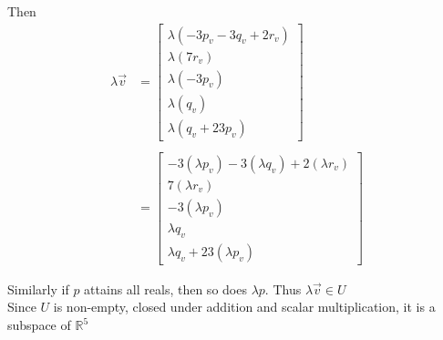 \documentclass{article}
\begin{document}
\begin{enumerate}[(a)]
    Then 
    \begin{align*}
    \lambda \vec{v} &= \begin{bmatrix}
        \lambda (-3p_v - 3q_v + 2r_v) \\
        \lambda (7r_v) \\
        \lambda (-3p_v) \\
        \lambda (q_v) \\
        \lambda (q_v + 23p_v )
    \end{bmatrix} \\
    \\
    & = \begin{bmatrix}
        -3(\lambda p_v) - 3(\lambda q_v) + 2(\lambda r_v) \\
        7(\lambda r_v) \\
        -3(\lambda p_v) \\
        \lambda q_v \\
        \lambda q_v  + 23(\lambda p_v) 
    \end{bmatrix}
    \end{align*}

    Similarly if \(p\) attains all reals, then so does \(\lambda p\). Thus \(\lambda \vec{v} \in U\)
    \\

    Since \(U\) is non-empty, closed under addition and scalar multiplication, 
    it is a subspace of \(\mathbb{R}^5\)
\end{enumerate}
\end{document}
